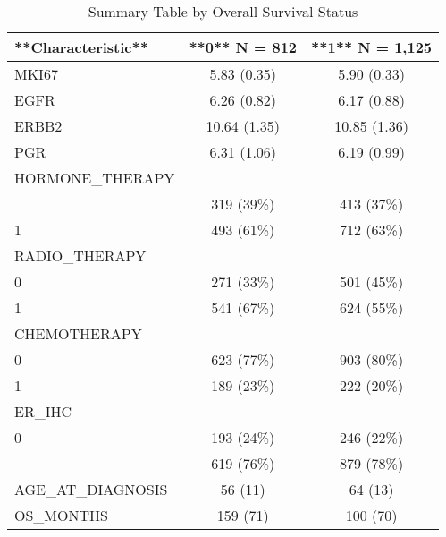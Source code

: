 \begin{table}

\caption{\label{tab:tab:summary}Summary Table by Overall Survival Status}
\centering
\begin{tabular}[t]{lcc}
\toprule
**Characteristic** & **0**  N = 812 & **1**  N = 1,125\\
\midrule
MKI67 & 5.83 (0.35) & 5.90 (0.33)\\
EGFR & 6.26 (0.82) & 6.17 (0.88)\\
ERBB2 & 10.64 (1.35) & 10.85 (1.36)\\
PGR & 6.31 (1.06) & 6.19 (0.99)\\
HORMONE\_THERAPY &  & \\
\addlinespace
0 & 319 (39\%) & 413 (37\%)\\
1 & 493 (61\%) & 712 (63\%)\\
RADIO\_THERAPY &  & \\
0 & 271 (33\%) & 501 (45\%)\\
1 & 541 (67\%) & 624 (55\%)\\
\addlinespace
CHEMOTHERAPY &  & \\
0 & 623 (77\%) & 903 (80\%)\\
1 & 189 (23\%) & 222 (20\%)\\
ER\_IHC &  & \\
0 & 193 (24\%) & 246 (22\%)\\
\addlinespace
1 & 619 (76\%) & 879 (78\%)\\
AGE\_AT\_DIAGNOSIS & 56 (11) & 64 (13)\\
OS\_MONTHS & 159 (71) & 100 (70)\\
\bottomrule
\end{tabular}
\end{table}

